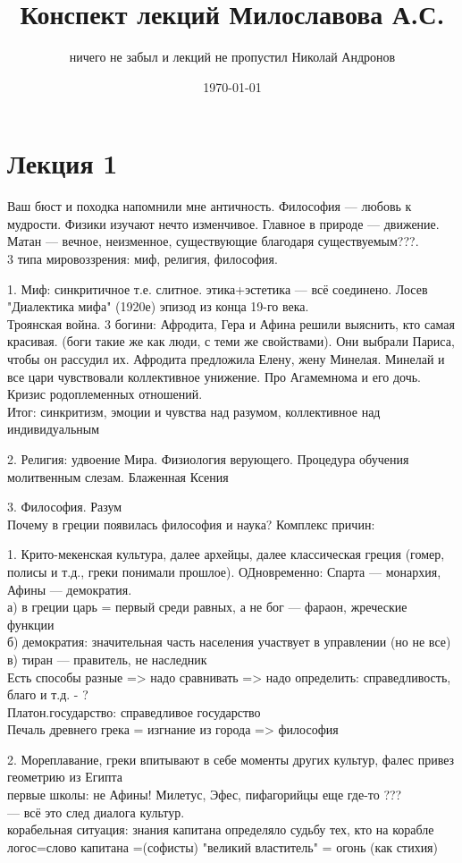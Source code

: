 \documentclass[a4paper,12pt]{article}
\author{ничего не забыл и лекций не пропустил Николай Андронов}
\title{Конспект лекций Милославова А.С.}
\date{\today}
\begin{document}
\maketitle
\section{Лекция 1}
Ваш бюст и походка напомнили мне античность. Философия --- любовь к мудрости. Физики изучают нечто изменчивое. Главное в природе --- движение. Матан --- вечное, неизменное, существующие благодаря существуемым???.\\
3 типа мировоззрения: миф, религия, философия.

1. Миф: синкритичное т.е. слитное. этика+эстетика --- всё соединено. Лосев "Диалектика мифа" (1920е) эпизод из конца 19-го века. \\
Троянская война. 3 богини: Афродита, Гера и Афина решили выяснить, кто самая красивая. (боги такие же как люди, с теми же свойствами). Они выбрали Париса, чтобы он рассудил их. Афродита предложила Елену, жену Минелая. Минелай и все цари чувствовали коллективное унижение. Про Агамемнома и его дочь. Кризис родоплеменных отношений.\\
Итог: синкритизм, эмоции и чувства над разумом, коллективное над индивидуальным

2. Религия: удвоение Мира. Физиология верующего. Процедура обучения молитвенным слезам. Блаженная Ксения

3. Философия. Разум\\
Почему в греции появилась философия и наука? Комплекс причин:

1. Крито-мекенская культура, далее архейцы, далее классическая греция (гомер, полисы и т.д., греки понимали прошлое). ОДновременно: Спарта --- монархия, Афины --- демократия. \\
а) в греции царь = первый среди равных, а не бог --- фараон, жреческие функции\\
б) демократия: значительная часть населения участвует в управлении (но не все)\\
в) тиран --- правитель, не наследник\\
Есть способы разные => надо сравнивать => надо определить: справедливость, благо и т.д. - ?\\
Платон.государство: справедливое государство\\
Печаль древнего грека = изгнание из города => философия

2. Мореплавание, греки впитывают в себе моменты других культур, фалес привез геометрию из Египта\\
первые школы: не Афины! Милетус, Эфес, пифагорийцы еще где-то ??? \\
--- всё это след диалога культур.\\
корабельная ситуация: знания капитана определяло судьбу тех, кто на корабле\\
логос=слово капитана =(софисты) "великий властитель" = огонь (как стихия)
\end{document}

